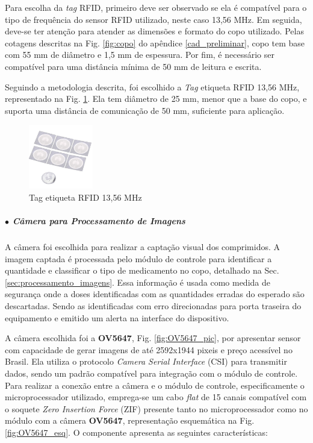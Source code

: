     Para escolha da \textit{tag} RFID, primeiro deve ser observado se ela é compatível para o tipo de frequência do sensor RFID utilizado, neste caso 13,56 MHz. Em seguida, deve-se ter atenção para atender as dimensões e formato do copo utilizado. Pelas cotagens descritas na Fig. \ref{fig:copo} do apêndice \ref{cad_preliminar}, copo tem base com 55 mm de diâmetro e 1,5 mm de espessura. Por fim, é necessário ser compatível para uma distância mínima de 50 mm de leitura e escrita.
   
    Seguindo a metodologia descrita, foi escolhido a \textit{Tag} etiqueta RFID 13,56 MHz, representado na Fig. \ref{fig:etiqueta_rfid}. Ela tem diâmetro de 25 mm, menor que a base do copo, e suporta uma distância de comunicação de 50 mm, suficiente para aplicação.

    \begin{figure}[H]
        \centering
        \includegraphics[width=0.25\textwidth]{figuras/eletronica/fotos_componentes/etiqueta_rfid.jpg}
        \caption{Tag etiqueta RFID 13,56 MHz}
        \label{fig:etiqueta_rfid}
     \end{figure}
    
    \subparagraph*{$\bullet$ Câmera para Processamento de Imagens} \hfill 
    
    A câmera foi escolhida para realizar a captação visual dos comprimidos. A imagem captada é processada pelo módulo de controle para identificar a quantidade e classificar o tipo de medicamento no copo, detalhado na Sec. \ref{sec:processamento_imagens}. Essa informação é usada como medida de segurança onde a doses identificadas com as quantidades erradas do esperado são descartadas. Sendo as identificadas com erro direcionadas para porta traseira do equipamento e emitido um alerta na interface do dispositivo. 
    
    A câmera escolhida foi a \textbf{OV5647}, Fig. \ref{fig:OV5647_pic}, por apresentar sensor com capacidade de gerar imagens de até 2592x1944 pixeis e preço acessível no Brasil. Ela utiliza o protocolo \textit{Camera Serial Interface} (CSI) para transmitir dados, sendo um padrão compatível para integração com o módulo de controle. Para realizar a conexão entre a câmera e o módulo de controle, especificamente o microprocessador utilizado, emprega-se um cabo \textit{flat} de 15 canais compatível com o soquete \textit{Zero Insertion Force} (ZIF) presente tanto no microprocessador como no módulo com a câmera \textbf{OV5647}, representação esquemática na Fig. \ref{fig:OV5647_esq}. O componente apresenta as seguintes características:
    
